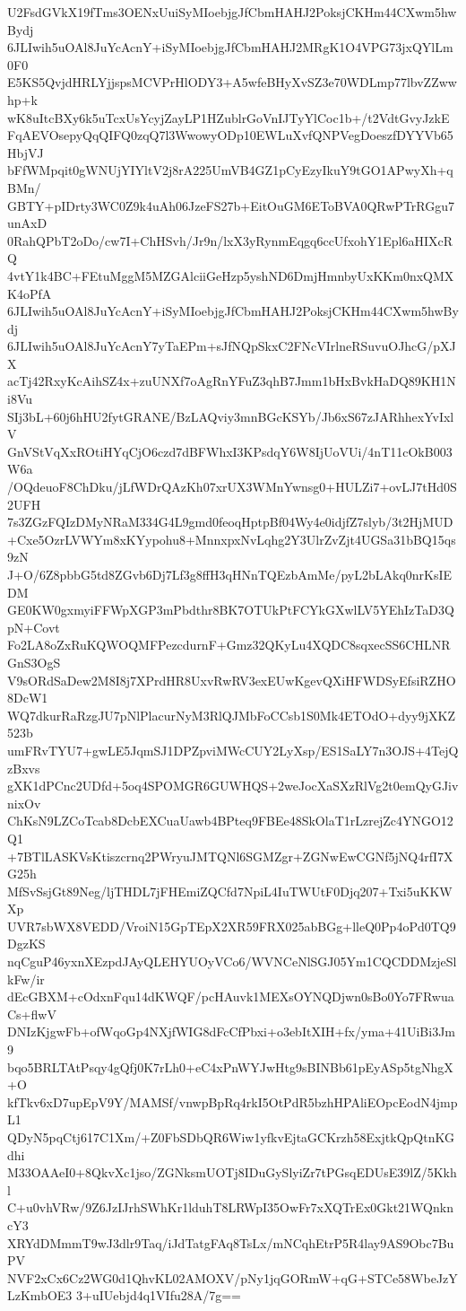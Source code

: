 U2FsdGVkX19fTms3OENxUuiSyMIoebjgJfCbmHAHJ2PoksjCKHm44CXwm5hwBydj
6JLIwih5uOAl8JuYcAcnY+iSyMIoebjgJfCbmHAHJ2MRgK1O4VPG73jxQYlLm0F0
E5KS5QvjdHRLYjjspsMCVPrHlODY3+A5wfeBHyXvSZ3e70WDLmp77lbvZZwwhp+k
wK8uItcBXy6k5uTcxUsYcyjZayLP1HZublrGoVnIJTyYlCoc1b+/t2VdtGvyJzkE
FqAEVOsepyQqQIFQ0zqQ7l3WwowyODp10EWLuXvfQNPVegDoeszfDYYVb65HbjVJ
bFfWMpqit0gWNUjYIYltV2j8rA225UmVB4GZ1pCyEzyIkuY9tGO1APwyXh+qBMn/
GBTY+pIDrty3WC0Z9k4uAh06JzeFS27b+EitOuGM6EToBVA0QRwPTrRGgu7unAxD
0RahQPbT2oDo/cw7I+ChHSvh/Jr9n/lxX3yRynmEqgq6ccUfxohY1Epl6aHIXcRQ
4vtY1k4BC+FEtuMggM5MZGAlciiGeHzp5yshND6DmjHmnbyUxKKm0nxQMXK4oPfA
6JLIwih5uOAl8JuYcAcnY+iSyMIoebjgJfCbmHAHJ2PoksjCKHm44CXwm5hwBydj
6JLIwih5uOAl8JuYcAcnY7yTaEPm+sJfNQpSkxC2FNcVIrlneRSuvuOJhcG/pXJX
acTj42RxyKcAihSZ4x+zuUNXf7oAgRnYFuZ3qhB7Jmm1bHxBvkHaDQ89KH1Ni8Vu
SIj3bL+60j6hHU2fytGRANE/BzLAQviy3mnBGcKSYb/Jb6xS67zJARhhexYvIxlV
GnVStVqXxROtiHYqCjO6czd7dBFWhxI3KPsdqY6W8IjUoVUi/4nT11cOkB003W6a
/OQdeuoF8ChDku/jLfWDrQAzKh07xrUX3WMnYwnsg0+HULZi7+ovLJ7tHd0S2UFH
7s3ZGzFQIzDMyNRaM334G4L9gmd0feoqHptpBf04Wy4e0idjfZ7slyb/3t2HjMUD
+Cxe5OzrLVWYm8xKYypohu8+MnnxpxNvLqhg2Y3UlrZvZjt4UGSa31bBQ15qs9zN
J+O/6Z8pbbG5td8ZGvb6Dj7Lf3g8ffH3qHNnTQEzbAmMe/pyL2bLAkq0nrKsIEDM
GE0KW0gxmyiFFWpXGP3mPbdthr8BK7OTUkPtFCYkGXwlLV5YEhIzTaD3QpN+Covt
Fo2LA8oZxRuKQWOQMFPezcdurnF+Gmz32QKyLu4XQDC8sqxecSS6CHLNRGnS3OgS
V9sORdSaDew2M8I8j7XPrdHR8UxvRwRV3exEUwKgevQXiHFWDSyEfsiRZHO8DcW1
WQ7dkurRaRzgJU7pNlPlacurNyM3RlQJMbFoCCsb1S0Mk4ETOdO+dyy9jXKZ523b
umFRvTYU7+gwLE5JqmSJ1DPZpviMWcCUY2LyXsp/ES1SaLY7n3OJS+4TejQzBxvs
gXK1dPCnc2UDfd+5oq4SPOMGR6GUWHQS+2weJocXaSXzRlVg2t0emQyGJivnixOv
ChKsN9LZCoTcab8DcbEXCuaUawb4BPteq9FBEe48SkOlaT1rLzrejZc4YNGO12Q1
+7BTlLASKVsKtiszcrnq2PWryuJMTQNl6SGMZgr+ZGNwEwCGNf5jNQ4rfI7XG25h
MfSvSsjGt89Neg/ljTHDL7jFHEmiZQCfd7NpiL4IuTWUtF0Djq207+Txi5uKKWXp
UVR7sbWX8VEDD/VroiN15GpTEpX2XR59FRX025abBGg+lleQ0Pp4oPd0TQ9DgzKS
nqCguP46yxnXEzpdJAyQLEHYUOyVCo6/WVNCeNlSGJ05Ym1CQCDDMzjeSlkFw/ir
dEcGBXM+cOdxnFqu14dKWQF/pcHAuvk1MEXsOYNQDjwn0sBo0Yo7FRwuaCs+flwV
DNIzKjgwFb+ofWqoGp4NXjfWIG8dFcCfPbxi+o3ebItXIH+fx/yma+41UiBi3Jm9
bqo5BRLTAtPsqy4gQfj0K7rLh0+eC4xPnWYJwHtg9sBINBb61pEyASp5tgNhgX+O
kfTkv6xD7upEpV9Y/MAMSf/vnwpBpRq4rkI5OtPdR5bzhHPAliEOpcEodN4jmpL1
QDyN5pqCtj617C1Xm/+Z0FbSDbQR6Wiw1yfkvEjtaGCKrzh58ExjtkQpQtnKGdhi
M33OAAeI0+8QkvXc1jso/ZGNksmUOTj8IDuGySlyiZr7tPGsqEDUsE39lZ/5Kkhl
C+u0vhVRw/9Z6JzIJrhSWhKr1lduhT8LRWpI35OwFr7xXQTrEx0Gkt21WQnkncY3
XRYdDMmmT9wJ3dlr9Taq/iJdTatgFAq8TsLx/mNCqhEtrP5R4lay9AS9Obc7BuPV
NVF2xCx6Cz2WG0d1QhvKL02AMOXV/pNy1jqGORmW+qG+STCe58WbeJzYLzKmbOE3
3+uIUebjd4q1VIfu28A/7g==
